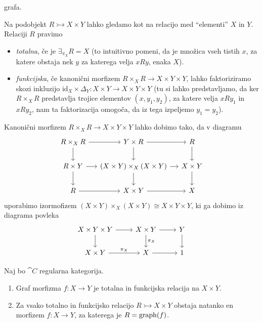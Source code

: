 \documentclass[../kategoricna_logika.tex]{subfiles}
\begin{document}
grafa.
\begin{definicija}
  Na podobjekt $R \rightarrowtail X \times Y$ lahko gledamo kot na
  relacijo med ``elementi'' $X$ in $Y$. Relaciji $R$ pravimo
  \begin{itemize}
  \item \emph{totalna}, če je $\exists_{\pi_X}R = X$ (to intuitivno
    pomeni, da je množica vseh tistih $x$, za katere obstaja nek $y$
    za katerega velja $xRy$, enaka $X$).
  \item \emph{funkcijska}, če kanonični morfizem
    $R \times_X R \to X \times Y \times Y$, lahko faktoriziramo skozi
    inkluzijo
    $\mathrm{id}_X \times \Delta_Y : X \times Y \to X \times Y \times
    Y$ (tu si lahko predstavljamo, da ker $R \times_X R$ predstavlja
    trojice elementov $(x, y_1, y_2)$, za katere velja $xRy_1$ in
    $xRy_2$, nam ta faktorizacija omogoča, da iz tega izpeljemo
    $y_1 = y_2$).
  \end{itemize}
\end{definicija}
\begin{opomba}
  Kanonični morfizem $R \times_X R \to X \times Y \times Y$ lahko
  dobimo tako, da v diagramu
  \begin{equation*}
    \begin{tikzcd}[row sep=normal, column sep=small]
      R \times_X R \ar[d] \ar[r] & Y \times R \ar[d] \ar[r] & R \ar[d] \\
      R \times Y \ar[d] \ar[r] & (X \times Y) \times_X (X \times Y) \ar[d] \ar[r] &
      X \times Y \ar[d] \\
      R \ar[r] & X \times Y \ar[r] & X
    \end{tikzcd}
  \end{equation*}
  uporabimo izormofizem
  $(X \times Y) \times_X (X \times Y) \cong X \times Y \times Y$, ki
  ga dobimo iz diagrama povleka
  \begin{equation*}
    \begin{tikzcd}[row sep=normal, column sep=normal]
      X \times Y  \times Y\ar[d] \ar[r] & X \times Y \ar[d, "\pi_X"] \ar[r] & Y \ar[d] \\
      X \times Y \ar[r, "\pi_X"] & X \ar[r] & 1
    \end{tikzcd}
  \end{equation*}
\end{opomba}
\begin{lema}\label{lema:funkcijska-relacija-ima-graf}
  Naj bo $\cat{C}$ regularna kategorija.
  \begin{enumerate}[label=(\roman*)]
  \item Graf morfizma $f : X \to Y$ je totalna in funkcijska relacija
    na $X \times Y$.
  \item Za vsako totalno in funkcijsko relacijo
    $R \rightarrowtail X \times Y$ obstaja natanko en morfizem
    $f : X \to Y$, za katerega je $R = \operatorname{graph}(f)$.
  \end{enumerate}
\end{lema}
\end{document}
